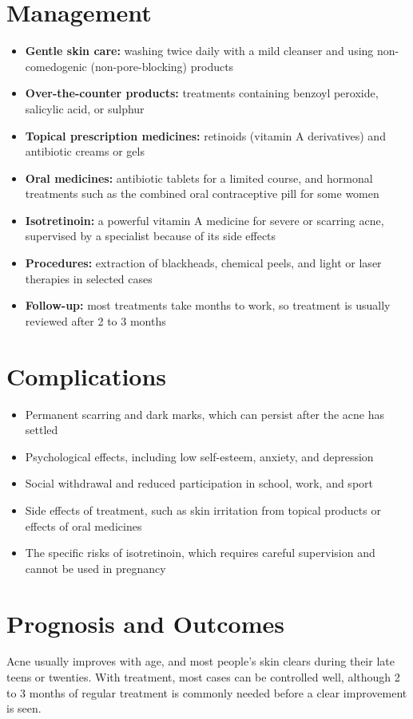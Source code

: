 \section*{Management}
\begin{itemize}
    \item \textbf{Gentle skin care:} washing twice daily with a mild cleanser and using non-comedogenic (non-pore-blocking) products
    \item \textbf{Over-the-counter products:} treatments containing benzoyl peroxide, salicylic acid, or sulphur
    \item \textbf{Topical prescription medicines:} retinoids (vitamin A derivatives) and antibiotic creams or gels
    \item \textbf{Oral medicines:} antibiotic tablets for a limited course, and hormonal treatments such as the combined oral contraceptive pill for some women
    \item \textbf{Isotretinoin:} a powerful vitamin A medicine for severe or scarring acne, supervised by a specialist because of its side effects
    \item \textbf{Procedures:} extraction of blackheads, chemical peels, and light or laser therapies in selected cases
    \item \textbf{Follow-up:} most treatments take months to work, so treatment is usually reviewed after 2 to 3 months
\end{itemize}

\section*{Complications}
\begin{itemize}
    \item Permanent scarring and dark marks, which can persist after the acne has settled
    \item Psychological effects, including low self-esteem, anxiety, and depression
    \item Social withdrawal and reduced participation in school, work, and sport
    \item Side effects of treatment, such as skin irritation from topical products or effects of oral medicines
    \item The specific risks of isotretinoin, which requires careful supervision and cannot be used in pregnancy
\end{itemize}

\section*{Prognosis and Outcomes}
Acne usually improves with age, and most people's skin clears during their late teens or twenties. With treatment, most cases can be controlled well, although 2 to 3 months of regular treatment is commonly needed before a clear improvement is seen.

